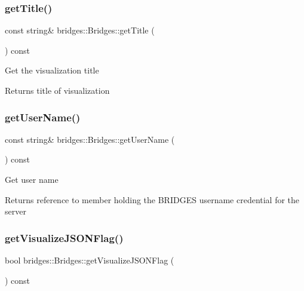 \subsubsection{\texorpdfstring{get\+Title()}{getTitle()}}
{\footnotesize\ttfamily const string\& bridges\+::\+Bridges\+::get\+Title (\begin{DoxyParamCaption}{ }\end{DoxyParamCaption}) const\hspace{0.3cm}{\ttfamily [inline]}}

Get the visualization title

\begin{DoxyReturn}{Returns}
title of visualization 
\end{DoxyReturn}
\mbox{\label{classbridges_1_1_bridges_ad16be2d94936fd555bc05f58c8c21f50}} 
\subsubsection{\texorpdfstring{get\+User\+Name()}{getUserName()}}
{\footnotesize\ttfamily const string\& bridges\+::\+Bridges\+::get\+User\+Name (\begin{DoxyParamCaption}{ }\end{DoxyParamCaption}) const\hspace{0.3cm}{\ttfamily [inline]}}

Get user name \begin{DoxyReturn}{Returns}
reference to member holding the B\+R\+I\+D\+G\+ES username credential for the server 
\end{DoxyReturn}
\mbox{\label{classbridges_1_1_bridges_a6c2897b19a25989e09c031152a74317d}} 
\subsubsection{\texorpdfstring{get\+Visualize\+J\+S\+O\+N\+Flag()}{getVisualizeJSONFlag()}}
{\footnotesize\ttfamily bool bridges\+::\+Bridges\+::get\+Visualize\+J\+S\+O\+N\+Flag (\begin{DoxyParamCaption}{ }\end{DoxyParamCaption}) const\hspace{0.3cm}{\ttfamily [inline]}}

